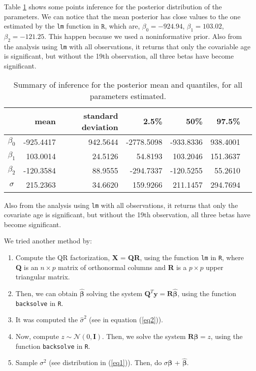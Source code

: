 \documentclass[a4paper, 11pt]{article}
\begin{document}
Table \ref{inference} shows some points inference for the posterior distribution of the parameters. We can notice that the mean posterior has close values to the one estimated by the \texttt{lm} function in $\texttt{R}$, which are, $\beta_0 = -924.94$, $\beta_1 = 103.02$, $\beta_2 = -121.25$. This happen because we used a noninformative prior. Also from the analysis using \texttt{lm} with all observations, it returns that only the covariable age is significant, but without the 19th observation, all three betas have become significant.

\begin{table}[H]
\caption{Summary of inference for the posterior mean and quantiles, for all parameters estimated.}\label{inference}
\centering
\begin{tabular}{crrrrrr}
\hline
 & \mbox{mean} & standard deviation & 2.5\% & 50\%  & 97.5\%  \\
\hline
$\beta_0$ & -925.4417 & 942.5644 & -2778.5098 & -933.8336 & 938.4001 \\

$\beta_1$ & 103.0014 & 24.5126 & 54.8193 & 103.2046 & 151.3637\\

$\beta_2$ & -120.3584 & 88.9555 & -294.7337 & -120.5255 & 55.2610\\

$\sigma$ & 215.2363 & 34.6620 & 159.9266 & 211.1457 & 294.7694  \\
\hline
\end{tabular}
\end{table}

Also from the analysis using \texttt{lm} with all observations, it returns that only the covariate age is significant, but without the 19th observation, all three betas have become significant.

We tried another method by:
\begin{enumerate}
\item Compute the QR factorization, \textbf{X} = \textbf{Q}\textbf{R}, using the function \texttt{lm} in \texttt{R}, where \textbf{Q} is an $n \times p$ matrix of orthonormal columns and \textbf{R} is a $p \times p$ upper triangular matrix.
\item Then, we can obtain $\boldsymbol{\hat{\beta}}$ solving the system $\textbf{Q}^T\textbf{y} = \textbf{R}\boldsymbol{\hat{\beta}}$, using the function \texttt{backsolve} in \texttt{R}.
\item It was computed the $\hat{\sigma}^2$ (see in equation (\ref{eq2})).
\item Now, compute $z \sim \mathcal{N}(0,\textbf{I})$. Then, we solve the system $\textbf{R}\boldsymbol{\beta} = z$, using the function \texttt{backsolve} in \texttt{R}.
\item Sample $\sigma^2$ (see distribution in (\ref{eq1})). Then, do $\sigma\boldsymbol{\beta}$ + $\boldsymbol{\hat{\beta}}$.
\end{enumerate}
\end{document}

